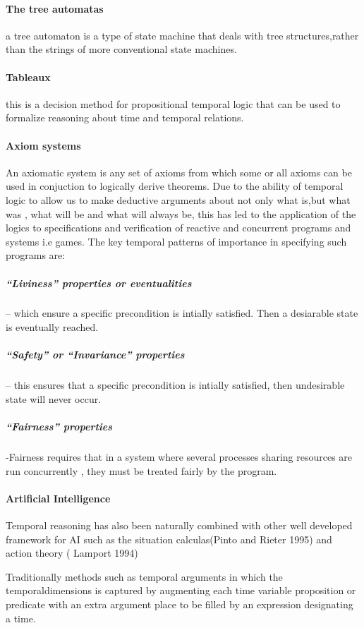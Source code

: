\documentclass[12pt,letterpaper]{article}
\begin{document}
{\paragraph{ The tree automatas}
	a tree automaton is a type of state machine that deals with tree structures,rather than the strings of more conventional state machines.
\paragraph{ Tableaux}
	this is a decision method for propositional temporal logic that can be used to formalize reasoning about time and temporal relations.
\paragraph{Axiom systems}
	An axiomatic system is any set of axioms from which some or all axioms can be used in conjuction to logically derive theorems.
Due to the ability of temporal logic to allow us to make deductive arguments about not only what is,but what was , what will be and what will always be, this has led to the application of the logics to specifications and verification of reactive and concurrent programs and systems i.e games.
The key temporal patterns of importance in specifying such programs are:
\subparagraph{“Liviness” properties or eventualities }– which ensure a specific precondition is intially satisfied. Then a desiarable state is eventually reached.
\subparagraph{“Safety” or “Invariance” properties} – this ensures that a specific precondition is intially satisfied, then undesirable state will never occur.
\subparagraph{“Fairness” properties} -Fairness requires that in a system where several processes sharing resources are run concurrently , they must be treated fairly by the program.
\paragraph{Artificial Intelligence}
	Temporal reasoning has also been naturally combined with other well developed framework for AI such as the situation calculas(Pinto and Rieter 1995) and action theory ( Lamport 1994)

Traditionally methods such as temporal arguments in which the temporaldimensions is captured by augmenting each time variable proposition or predicate with an extra argument place to be filled by an expression designating a time.
}
\end{document}
